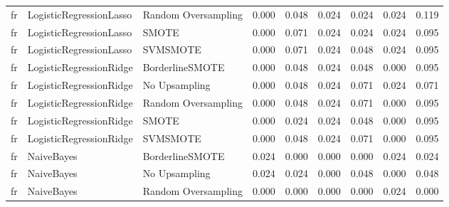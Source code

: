 \begin{tabular}{lllllllll}
      fr &      LogisticRegressionLasso & Random Oversampling & 0.000 &                     0.048 &                 0.024 &                  0.024 &                                   0.024 &     0.119 \\
      fr &      LogisticRegressionLasso &               SMOTE & 0.000 &                     0.071 &                 0.024 &                  0.024 &                                   0.024 &     0.095 \\
      fr &      LogisticRegressionLasso &            SVMSMOTE & 0.000 &                     0.071 &                 0.024 &                  0.048 &                                   0.024 &     0.095 \\
      fr &      LogisticRegressionRidge &     BorderlineSMOTE & 0.000 &                     0.048 &                 0.024 &                  0.048 &                                   0.000 &     0.095 \\
      fr &      LogisticRegressionRidge &       No Upsampling & 0.000 &                     0.048 &                 0.024 &                  0.071 &                                   0.024 &     0.071 \\
      fr &      LogisticRegressionRidge & Random Oversampling & 0.000 &                     0.048 &                 0.024 &                  0.071 &                                   0.000 &     0.095 \\
      fr &      LogisticRegressionRidge &               SMOTE & 0.000 &                     0.024 &                 0.024 &                  0.048 &                                   0.000 &     0.095 \\
      fr &      LogisticRegressionRidge &            SVMSMOTE & 0.000 &                     0.048 &                 0.024 &                  0.071 &                                   0.000 &     0.095 \\
      fr &                   NaiveBayes &     BorderlineSMOTE & 0.024 &                     0.000 &                 0.000 &                  0.000 &                                   0.024 &     0.024 \\
      fr &                   NaiveBayes &       No Upsampling & 0.024 &                     0.024 &                 0.000 &                  0.048 &                                   0.000 &     0.048 \\
      fr &                   NaiveBayes & Random Oversampling & 0.000 &                     0.000 &                 0.000 &                  0.000 &                                   0.024 &     0.000 \\

\end{tabular}
